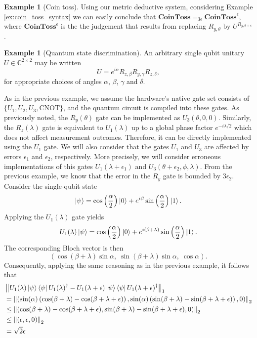 \documentclass[10pt,a4paper]{amsart}
\theoremstyle{definition}
\theoremstyle{definition}
\newtheorem{example}[definition]{Example}
\theoremstyle{definition}
\theoremstyle{definition}
\theoremstyle{definition}
\theoremstyle{definition}
\begin{document}
\begin{example}[Coin toss]
Using our metric deductive system, considering Example \ref{ex:coin_toss_syntax} we can easily conclude that $\textbf{CoinToss} =_{3 \epsilon} \textbf{CoinToss}^{\epsilon}$, where $\textbf{CoinToss}^{\epsilon}$ is the the judgement that results from replacing $R_{y, \theta}$ by $U^{R_{y, \theta + \epsilon}}$.

\end {example}

\begin{example}[Quantum state discrimination]
  An arbitrary single qubit unitary $U \in \mathbb{C}^{2 \times 2}$ may be written
\[
U = e^{i\alpha} R_{z,\beta} R_{y,\gamma} R_{z,\delta},
\]
for appropriate choices of angles $\alpha$, $\beta$, $\gamma$ and $\delta$.


As in the previous example, we assume the hardware's native gate set consists of $\{U_1, U_2, U_3, \text{CNOT}\}$, and the quantum circuit is compiled into these gates.  
As previously noted, the $R_y(\theta)$ gate can be implemented as $U_3(\theta, 0, 0)$.  
Similarly, the $R_z(\lambda)$ gate is equivalent to $U_1(\lambda)$ up to a global phase factor $e^{-i\lambda/2}$ which does not affect measurement outcomes. 
Therefore, it can be directly implemented using the $U_1$ gate.  
We will also consider that the gates $U_1$ and $U_3$ are affected by errors $\epsilon_1$ and $\epsilon_2$, respectively. 
More precisely, we will consider erroneous implementations of this gates $U_1(\lambda + \epsilon_1)$ and $U_3(\theta + \epsilon_2, \phi, \lambda)$. 
From the previous example, we know that the error in the $R_y$ gate is bounded by $3 \epsilon_2$. 
Consider the single-qubit state
\[
\ket{\psi} = \cos\left(\frac{\alpha}{2}\right)\ket{0} + e^{i\beta}\sin\left(\frac{\alpha}{2}\right)\ket{1}.
\]
Applying the \( U_1(\lambda) \) gate yields
\[
U_1(\lambda)\ket{\psi} = \cos\left(\frac{\alpha}{2}\right)\ket{0} + e^{i(\beta + \lambda)}\sin\left(\frac{\alpha}{2}\right)\ket{1}.
\]
The corresponding Bloch vector is then
\[
\left(\!\cos(\beta + \lambda)\sin\alpha,\; \sin(\beta + \lambda)\sin\alpha,\; \cos\alpha\right).
\]
Consequently, applying the same reasoning as in the previous example, it follows that
\begin{align*}
  & \left\lVert U_1(\lambda) \ket{\psi}\bra{\psi} U_1(\lambda)^\dag - U_1(\lambda + \epsilon) \ket{\psi}\bra{\psi}U_1(\lambda + \epsilon)^\dag  \right\rVert_{1} \\
  & = \left\lVert \left(\sin(\alpha) \left( \cos(\beta + \lambda) -  \cos(\beta + \lambda + \epsilon) \right),\sin(\alpha) \left( \sin(\beta + \lambda) -  \sin(\beta + \lambda + \epsilon) \right),0 \right) \right\rVert_{2} \\
  & \leq \left\lVert \left( \cos(\beta + \lambda) -  \cos(\beta + \lambda + \epsilon) , \sin(\beta + \lambda) -  \sin(\beta + \lambda + \epsilon) ,0 \right) \right\rVert_{2} \\
  & \leq \left\lVert \left( \epsilon, \epsilon ,0 \right) \right\rVert_{2} \\
  & = \sqrt{2}\epsilon \\
\end{align*} 


\end{example}
\end{document}

